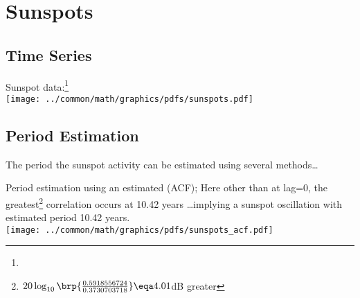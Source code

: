 
\section{Sunspots}
\subsection{Time Series}
\begin{example}
\label{ex:sunspots}
Sunspot data:\footnote{}
\\\texttt{[image: ../common/math/graphics/pdfs/sunspots.pdf]}
\end{example}

\subsection{Period Estimation}
The period the sunspot activity can be estimated using several methods\ldots
\begin{example}
\label{ex:sunspot_period_ACF}
Period estimation using an estimated  (ACF);
Here other than at lag=0, the greatest\footnote{$20\log_{10}\brp{\frac{0.5918556724}{0.3730703718}}\eqa4.01$dB greater}
 correlation occurs at 10.42 years \ldots implying a sunspot oscillation with estimated period 10.42 years.
\\\texttt{[image: ../common/math/graphics/pdfs/sunspots\_acf.pdf]}
\end{example}

